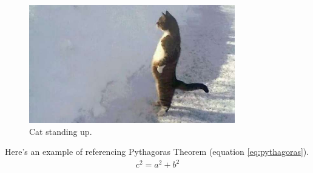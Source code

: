\documentclass[12pt]{article}
\begin{document}
\begin{figure}[H]	%
	\centering 		%
	\includegraphics[width=0.8\textwidth]{cat}	%
	\caption{Cat standing up.}	%
	\label{fig:cat}	%
\end{figure}

Here's an example of referencing Pythagoras Theorem (equation \ref{eq:pythagoras}).
\begin{align} \label{eq:pythagoras}
	c^2 = a^2 + b^2
\end{align}





\printbibliography
\end{document}
